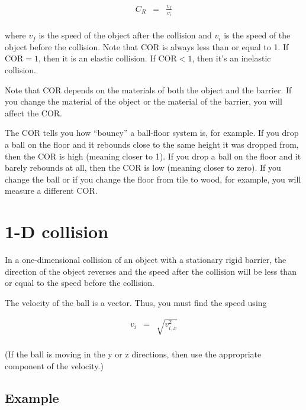 \begin{eqnarray*}
	C_R & = & \frac{v_f}{v_i} \\
\end{eqnarray*}

where $v_f$ is the speed of the object after the collision and $v_i$ is the speed of the object before the collision. Note that COR is always less than or equal to 1. If COR$=1$, then it is an elastic collision. If COR$<1$, then it's an inelastic collision.

Note that COR depends on the materials of both the object and the barrier. If you change the material of the object or the material of the barrier, you will affect the COR.

The COR tells you how ``bouncy'' a ball-floor system is, for example. If you drop a ball on the floor and it rebounds close to the same height it was dropped from, then the COR is high (meaning closer to 1). If you drop a ball on the floor and it barely rebounds at all, then the COR is low (meaning closer to zero). If you change the ball or if you change the floor from tile to wood, for example, you will measure a different COR.

\section*{1-D collision}

In a one-dimensional collision of an object with a stationary rigid barrier, the direction of the object reverses and the speed after the collision will be less than or equal to the speed before the collision.


The velocity of the ball is a vector. Thus, you must find the speed using

\begin{eqnarray*}
	v_i & = & \sqrt{v_{i,x}^2} \\
\end{eqnarray*}

(If the ball is moving in the y or z directions, then use the appropriate component of the velocity.)

\subsection*{Example}


